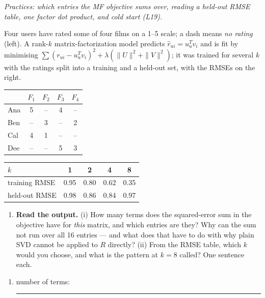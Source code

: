 \documentclass[
  11pt,
]{article}
\providecommand{\tightlist}{%
  \setlength{\itemsep}{0pt}\setlength{\parskip}{0pt}}
\newcommand{\blank}[1][1.2in]{\rule{#1}{0.4pt}}
\begin{document}
\emph{Practices: which entries the MF objective sums over, reading a
held-out RMSE table, one factor dot product, and cold start (L19).}

Four users have rated some of four films on a 1--5 scale; a dash means
\emph{no rating} (left). A rank-\(k\) matrix-factorization model
predicts \(\hat r_{ui} = u_u^T v_i\) and is fit by minimising
\(\sum (r_{ui} - u_u^Tv_i)^2 + \lambda(\|U\|^2 + \|V\|^2)\); it was
trained for several \(k\) with the ratings split into a training and a
held-out set, with the RMSEs on the right.

\begin{center}
\begin{minipage}[c]{0.42\textwidth}\centering
\begin{tabular}{@{}l cccc@{}}\toprule
 & $F_1$ & $F_2$ & $F_3$ & $F_4$\\ \midrule
Ana & 5 & -- & 4 & --\\
Ben & -- & 3 & -- & 2\\
Cal & 4 & 1 & -- & --\\
Dee & -- & -- & 5 & 3\\
\bottomrule\end{tabular}
\end{minipage}\hfill
\begin{minipage}[c]{0.54\textwidth}\centering
\begin{tabular}{@{}l cccc@{}}\toprule
$k$ & 1 & 2 & 4 & 8\\ \midrule
training RMSE & 0.95 & 0.80 & 0.62 & 0.35\\
held-out RMSE & 0.98 & 0.86 & 0.84 & 0.97\\
\bottomrule\end{tabular}
\end{minipage}
\end{center}

\begin{enumerate}
\def\labelenumi{(\alph{enumi})}
\tightlist
\item
  \textbf{Read the output.} (i) How many terms does the squared-error
  sum in the objective have for \emph{this} matrix, and which entries
  are they? Why can the sum not run over all 16 entries --- and what
  does that have to do with why plain SVD cannot be applied to \(R\)
  directly? (ii) From the RMSE table, which \(k\) would you choose, and
  what is the pattern at \(k=8\) called? One sentence each.
\end{enumerate}

\begin{enumerate}
\def\labelenumi{(\roman{enumi})}
\tightlist
\item
  number of terms: \blank[0.7in]
\end{enumerate}
\end{document}
